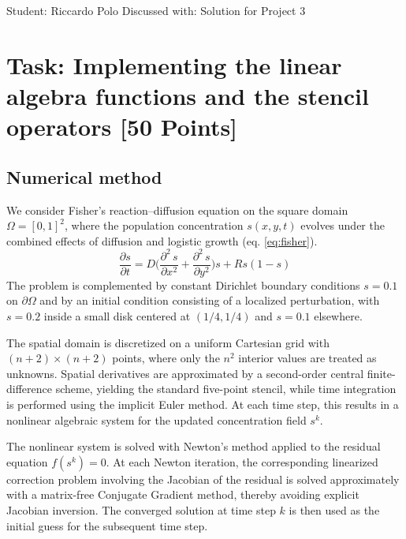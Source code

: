 \documentclass[unicode,10pt,a4paper,oneside,numbers=endperiod,openany]{scrartcl}
\begin{document}
\setassignment
{}

            {Student: Riccardo Polo}
            {Discussed with:}
            {Solution for Project 3}{}
\newline

\assignmentpolicy

\newpage
\section{Task: Implementing the linear algebra functions and the stencil
         operators [50 Points]}
\subsection{Numerical method }
We consider Fisher's reaction--diffusion equation on the square domain \(\Omega=[0,1]^2\), where the population concentration \(s(x,y,t)\) evolves under the combined effects of diffusion and logistic growth (eq. \ref{eq:fisher}).
\begin{equation}
\label{eq:fisher}
\frac{\partial s}{\partial t} = D \biggl(\frac{\partial^2\, s}{\partial x^2} + \frac{\partial^2\, s}{\partial y^2}\biggr) s + R s (1 - s)
\end{equation}
The problem is complemented by constant Dirichlet boundary conditions \(s=0.1\) on \(\partial\Omega\) and by an initial condition consisting of a localized perturbation, with \(s=0.2\) inside a small disk centered at \((1/4,1/4)\) and \(s=0.1\) elsewhere.

The spatial domain is discretized on a uniform Cartesian grid with \((n+2)\times(n+2)\) points, where only the \(n^2\) interior values are treated as unknowns. Spatial derivatives are approximated by a second-order central finite-difference scheme, yielding the standard five-point stencil, while time integration is performed using the implicit Euler method. At each time step, this results in a nonlinear algebraic system for the updated concentration field \(s^k\).

The nonlinear system is solved with Newton's method applied to the residual equation \(f(s^k)=0\). At each Newton iteration, the corresponding linearized correction problem involving the Jacobian of the residual is solved approximately with a matrix-free Conjugate Gradient method, thereby avoiding explicit Jacobian inversion. The converged solution at time step \(k\) is then used as the initial guess for the subsequent time step.\\
\end{document}
